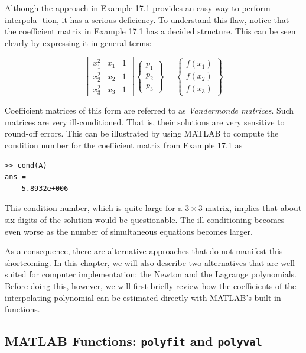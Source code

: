 \documentclass[../main.tex]{subfiles}
\begin{document}
Although the approach in Example 17.1 provides an easy way to perform interpola-
tion, it has a serious deficiency. To understand this flaw, notice that the coefficient matrix
in Example 17.1 has a decided structure. This can be seen clearly by expressing it in general terms:

\begin{equation}
	\tag{17.3}
	\begin{bmatrix}
		x ^ 2 _ 1 & x_1 & 1 \\
		x ^ 2 _ 2 & x_2 & 1 \\
		x ^ 2 _ 3 & x_3 & 1
	\end{bmatrix}
	\begin{Bmatrix}
		p_1 \\ p_2 \\ p_3
	\end{Bmatrix}
	=
	\begin{Bmatrix}
		f(x_1) \\
		f(x_2) \\
		f(x_3)
	\end{Bmatrix}
\end{equation}

Coefficient matrices of this form are referred to as \textit{Vandermonde matrices}. Such matrices are very ill-conditioned. That is, their solutions are very sensitive to round-off errors.
This can be illustrated by using MATLAB to compute the condition number for the coefficient matrix from Example 17.1 as

\begin{lstlisting}[numbers=none]
	>> cond(A)
ans =
	5.8932e+006
\end{lstlisting}

This condition number, which is quite large for a $3 \times 3$ matrix, implies that about six digits
of the solution would be questionable. The ill-conditioning becomes even worse as the
number of simultaneous equations becomes larger.

As a consequence, there are alternative approaches that do not manifest this shortcoming. In this chapter, we will also describe two alternatives that are well-suited for
computer implementation: the Newton and the Lagrange polynomials. Before doing this,
however, we will first briefly review how the coefficients of the interpolating polynomial
can be estimated directly with MATLAB's built-in functions.

\label{cha:cha_P_17_1_2}
\subsection{MATLAB Functions: \texttt{polyfit} and \texttt{polyval}}
\end{document}
